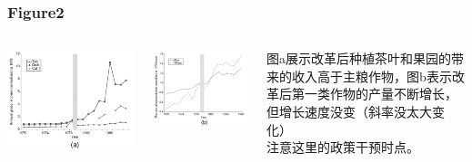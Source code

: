 \documentclass{beamer}
\begin{document}
\begin{frame}
\frametitle{Figure2}
	\begin{columns}
            \begin{minipage}[c][0.4\textheight][c]{\linewidth}
                \centering
                \includegraphics[width=0.8\linewidth]{figure2_a}
            \end{minipage}
            \begin{minipage}[c][0.4\textheight][c]{\linewidth}
                \centering
                \includegraphics[width=0.8\linewidth]{figure2_b}
            \end{minipage}

           	\begin{minipage}[c][0.4\textheight][c]{\linewidth}
            图a展示改革后种植茶叶和果园的带来的收入高于主粮作物，图b表示改革后第一类作物的产量不断增长，但增长速度没变（斜率没太大变化）
            \\ 注意这里的政策干预时点。
            \end{minipage}
    \end{columns}
\end{frame}
\end{document}
